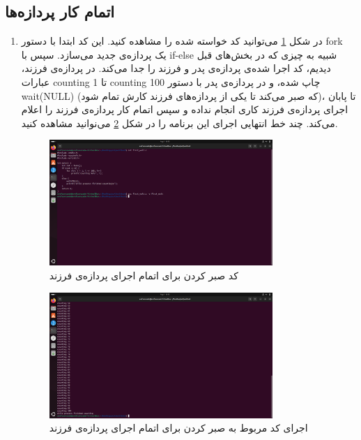 \documentclass[12pt]{article}
\begin{document}
        \subsection{اتمام کار پردازه‌ها}

        \begin{enumerate}
        \item 
        در شکل
        \ref{im9}
        می‌توانید کد خواسته شده را مشاهده کنید. این کد ابتدا با دستور
        \textenglish{fork}
        یک پردازه‌ی جدید می‌سازد. سپس با 
        \textenglish{if-else}
        شبیه به چیزی که در بخش‌های قبل دیدیم، کد اجرا شده‌ی پردازه‌ی پدر و فرزند را جدا می‌کند. در پردازه‌ی فرزند، عبارات 
        \textenglish{counting 1}
        تا 
        \textenglish{counting 100}
        چاپ شده، و در پردازه‌ی پدر با دستور
        \textenglish{wait(NULL)}
        (که صبر می‌کند تا یکی از پردازه‌های فرزند کارش تمام شود)،
        تا پابان اجرای پردازه‌ی فرزند کاری انجام نداده و سپس اتمام کار پردازه‌ی فرزند را اعلام می‌کند. چند خط انتهایی اجرای این برنامه را در شکل
        \ref{im10}
        می‌نوانید مشاهده کنید.

        \begin{figure}[H]
		\centering
		\includegraphics[width=0.8\textwidth]{report4-resources/9.png}
		\caption{کد صبر کردن برای اتمام اجرای پردازه‌ی فرزند}
            \label{im9}
	\end{figure}

        \begin{figure}[H]
		\centering
		\includegraphics[width=0.8\textwidth]{report4-resources/10.png}
		\caption{اجرای کد مربوط به صبر کردن برای اتمام اجرای پردازه‌ی فرزند}
            \label{im10}
	\end{figure}


\end{enumerate}
\end{document}
